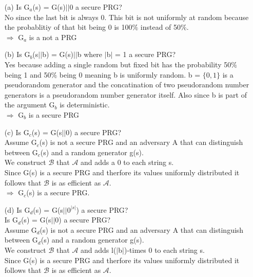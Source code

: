 
\begin{itemize}
\item[(a)]
	Is G\(_{a}\)(s) = G(s)\(\vert \vert\)0 a secure PRG? \\
	No since the last bit is always 0. This bit is not uniformly at random because the probablitiy of that bit being 0 is 100\(\%\) instead of 50\(\%\). \\
	\(\Rightarrow\)  G\(_{a}\) is a not a PRG
\item[(b)]
	Is G\(_{b}\)(s\(\vert \vert\)b) = G(s)\(\vert \vert\)b where \(\vert\)b\(\vert\) = 1 a secure PRG? \\
	Yes because adding a single random but fixed bit has the probability 50\(\%\) being 1 and  50\(\%\) being 0 meaning b is uniformly random.
	b = \(\{0,1\}\) is a pseudorandom generator and the concatination of two pseudorandom number generators is a pseudorandom number generator itself.
	Also since b is part of the argument G\(_{b}\) is deterministic. \\
	\(\Rightarrow\)  G\(_{b}\) is a secure PRG\\
\item[(c)]
	Is G\(_{c}\)(s) = G(s\(\vert \vert\)0) a secure PRG? \\
	Assume  G\(_{c}\)(s)  is not a secure PRG and an adversary A that can distinguish between  G\(_{c}\)(s) and a random generator g(s).\\
	We construct \(\mathcal{B}\) that \(\mathcal{A}\)  and adds a 0 to each string s.\\
	Since G(s) is a secure PRG and therfore its values uniformly distributed it follows that \(\mathcal{B}\) is as efficient as \(\mathcal{A}\).\\
	\(\Rightarrow\) G\(_{c}\)(s) is a secure PRG.
\item[(d)]
	Is G\(_{d}\)(s) = G(s\(\vert \vert\)\(0^{\vert s \vert}\)) a secure PRG? \\
	Is G\(_{d}\)(s) = G(s\(\vert \vert\)0) a secure PRG? \\
	Assume  G\(_{d}\)(s)  is not a secure PRG and an adversary A that can distinguish between  G\(_{d}\)(s) and a random generator g(s).\\
	We construct \(\mathcal{B}\) that \(\mathcal{A}\)  and adds l(\(\vert\)b\(\vert\))-times 0 to each string s.\\
	Since G(s) is a secure PRG and therfore its values uniformly distributed it follows that \(\mathcal{B}\) is as efficient as \(\mathcal{A}\).\\

\end{itemize}
